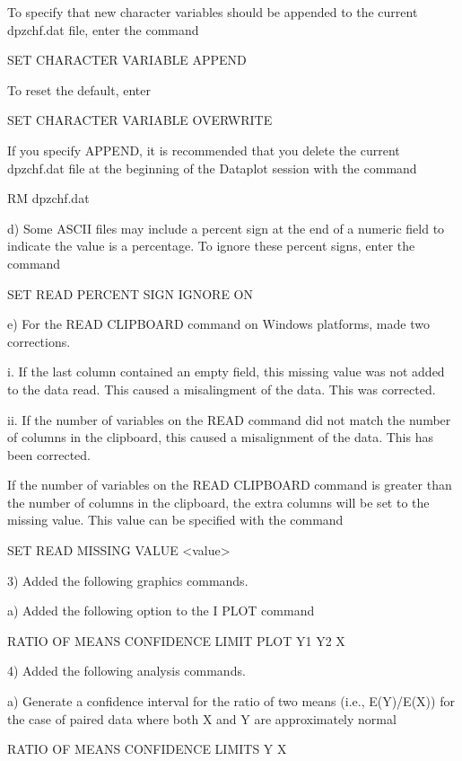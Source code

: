        To specify that new character variables should be appended to
       the current dpzchf.dat file, enter the command

           SET CHARACTER VARIABLE APPEND

       To reset the default, enter

           SET CHARACTER VARIABLE OVERWRITE

       If you specify APPEND, it is recommended that you delete the
       current dpzchf.dat file at the beginning of the Dataplot session
       with the command

           RM dpzchf.dat

    d) Some ASCII files may include a percent sign at the end of a
       numeric field to indicate the value is a percentage.  To ignore
       these percent signs, enter the command

           SET READ PERCENT SIGN IGNORE ON

    e) For the READ CLIPBOARD command on Windows platforms, made two
       corrections.

         i. If the last column contained an empty field, this missing
            value was not added to the data read.  This caused a
            misalingment of the data.  This was corrected.

        ii. If the number of variables on the READ command did not
            match the number of columns in the clipboard, this caused a
            misalignment of the data.  This has been corrected.

            If the number of variables on the READ CLIPBOARD command is
            greater than the number of columns in the clipboard, the
            extra columns will be set to the missing value.  This value
            can be specified with the command

                SET READ MISSING VALUE <value>

 3) Added the following graphics commands.

    a) Added the following option to the I PLOT command

          RATIO OF MEANS CONFIDENCE LIMIT PLOT Y1 Y2 X

 4) Added the following analysis commands.

    a) Generate a confidence interval for the ratio of two means
       (i.e., E(Y)/E(X)) for the case of paired data where both X and Y
       are approximately normal

          RATIO OF MEANS CONFIDENCE LIMITS Y X

